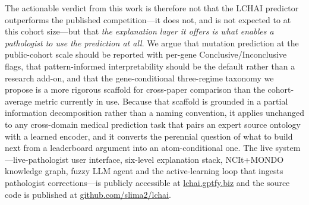 The actionable verdict from this work is therefore not that the
LCHAI predictor outperforms the published competition---it does
not, and is not expected to at this cohort size---but that
\emph{the explanation layer it offers is what enables a
pathologist to use the prediction at all}.
We argue that mutation prediction at the public-cohort scale
should be reported with per-gene Conclusive/Inconclusive flags,
that pattern-informed interpretability should be the default
rather than a research add-on, and that the gene-conditional
three-regime taxonomy we propose is a more rigorous scaffold for
cross-paper comparison than the cohort-average metric currently
in use.
Because that scaffold is grounded in a partial information decomposition
rather than a naming convention, it applies unchanged to any
cross-domain medical prediction task that pairs an expert source
ontology with a learned encoder, and it converts the perennial
question of what to build next from a leaderboard argument into an
atom-conditional one.
The live system---live-pathologist user interface, six-level
explanation stack, NCIt+MONDO knowledge graph, fuzzy LLM agent
and the active-learning loop that ingests pathologist
corrections---is publicly accessible at
\href{https://lchai.gptfy.biz}{lchai.gptfy.biz} and the source
code is published at \href{https://github.com/slima2/lchai}{github.com/slima2/lchai}.
